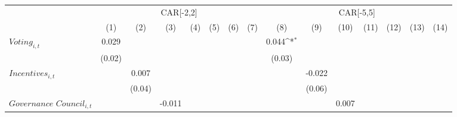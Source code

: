{
\def\sym#1{\ifmmode^{#1}\else\(^{#1}\)\fi}
\begin{tabular}{l*{14}{c}}
\toprule
                    &\multicolumn{7}{c}{CAR[-2,2]}                                                                                                                            &\multicolumn{7}{c}{CAR[-5,5]}                                                                                                                            \\
                    &\multicolumn{1}{c}{(1)}         &\multicolumn{1}{c}{(2)}         &\multicolumn{1}{c}{(3)}         &\multicolumn{1}{c}{(4)}         &\multicolumn{1}{c}{(5)}         &\multicolumn{1}{c}{(6)}         &\multicolumn{1}{c}{(7)}         &\multicolumn{1}{c}{(8)}         &\multicolumn{1}{c}{(9)}         &\multicolumn{1}{c}{(10)}         &\multicolumn{1}{c}{(11)}         &\multicolumn{1}{c}{(12)}         &\multicolumn{1}{c}{(13)}         &\multicolumn{1}{c}{(14)}         \\
\midrule
$\textit{Voting}_{i,t}$&       0.029         &                     &                     &                     &                     &                     &                     &       0.044\sym{*}  &                     &                     &                     &                     &                     &                     \\
                    &      (0.02)         &                     &                     &                     &                     &                     &                     &      (0.03)         &                     &                     &                     &                     &                     &                     \\
$\textit{Incentives}_{i,t}$&                     &       0.007         &                     &                     &                     &                     &                     &                     &      -0.022         &                     &                     &                     &                     &                     \\
                    &                     &      (0.04)         &                     &                     &                     &                     &                     &                     &      (0.06)         &                     &                     &                     &                     &                     \\
$\textit{Governance Council}_{i,t}$&                     &                     &      -0.011         &                     &                     &                     &                     &                     &                     &       0.007         &                     &                     &                     &                     \\

\end{tabular}}
